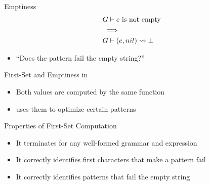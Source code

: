 \documentclass{beamer}
\begin{document}
\begin{frame}{Emptiness}
    \begin{align*}
        & \text{$G \vdash e$ is not empty} \\
        & \implies \\
        & G \vdash (e, nil) \rightsquigarrow \bot
    \end{align*}
    \begin{itemize}
        \item ``Does the pattern fail the empty string?''
    \end{itemize}
\end{frame}

\begin{frame}{First-Set and Emptiness in \lpeg{}}
    \begin{itemize}
        \item Both values are computed by the same function
        \item \lpeg{} uses them to optimize certain patterns
    \end{itemize}
\end{frame}

\begin{frame}{Properties of First-Set Computation}
    \begin{itemize}
        \item It terminates for any well-formed grammar and expression
        \item It correctly identifies first characters that make a pattern fail
        \item It correctly identifies patterns that fail the empty string
    \end{itemize}
\end{frame}
\end{document}
